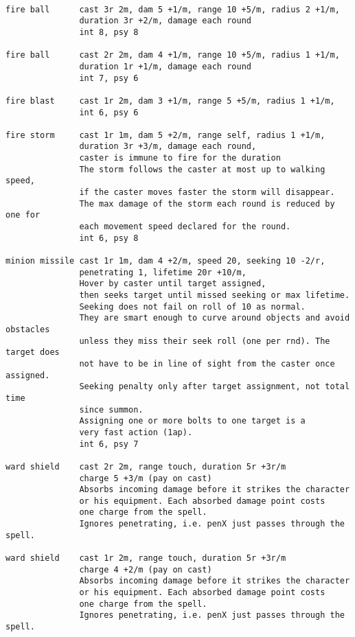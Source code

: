 \

\small \begin{verbatim}
fire ball      cast 3r 2m, dam 5 +1/m, range 10 +5/m, radius 2 +1/m,
               duration 3r +2/m, damage each round
               int 8, psy 8

fire ball      cast 2r 2m, dam 4 +1/m, range 10 +5/m, radius 1 +1/m,
               duration 1r +1/m, damage each round
               int 7, psy 6

fire blast     cast 1r 2m, dam 3 +1/m, range 5 +5/m, radius 1 +1/m,
               int 6, psy 6

fire storm     cast 1r 1m, dam 5 +2/m, range self, radius 1 +1/m,
               duration 3r +3/m, damage each round,
               caster is immune to fire for the duration
               The storm follows the caster at most up to walking speed,
               if the caster moves faster the storm will disappear.
               The max damage of the storm each round is reduced by one for
               each movement speed declared for the round.
               int 6, psy 8

minion missile cast 1r 1m, dam 4 +2/m, speed 20, seeking 10 -2/r,
               penetrating 1, lifetime 20r +10/m,
               Hover by caster until target assigned,
               then seeks target until missed seeking or max lifetime.
               Seeking does not fail on roll of 10 as normal.
               They are smart enough to curve around objects and avoid obstacles
               unless they miss their seek roll (one per rnd). The target does
               not have to be in line of sight from the caster once assigned.
               Seeking penalty only after target assignment, not total time
               since summon.
               Assigning one or more bolts to one target is a
               very fast action (1ap).
               int 6, psy 7

ward shield    cast 2r 2m, range touch, duration 5r +3r/m
               charge 5 +3/m (pay on cast)
               Absorbs incoming damage before it strikes the character
               or his equipment. Each absorbed damage point costs
               one charge from the spell.
               Ignores penetrating, i.e. penX just passes through the spell.

ward shield    cast 1r 2m, range touch, duration 5r +3r/m
               charge 4 +2/m (pay on cast)
               Absorbs incoming damage before it strikes the character
               or his equipment. Each absorbed damage point costs
               one charge from the spell.
               Ignores penetrating, i.e. penX just passes through the spell.


\end{verbatim}
